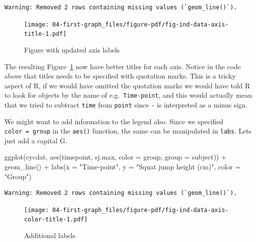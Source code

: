 \documentclass[
  11pt,
  letterpaper,
]{scrbook}
\newenvironment{Shaded}{\begin{snugshade}}{\end{snugshade}}
\newcommand{\AttributeTok}[1]{\textcolor[rgb]{0.40,0.45,0.13}{#1}}
\newcommand{\FunctionTok}[1]{\textcolor[rgb]{0.28,0.35,0.67}{#1}}
\newcommand{\NormalTok}[1]{\textcolor[rgb]{0.00,0.23,0.31}{#1}}
\newcommand{\SpecialCharTok}[1]{\textcolor[rgb]{0.37,0.37,0.37}{#1}}
\newcommand{\StringTok}[1]{\textcolor[rgb]{0.13,0.47,0.30}{#1}}
\begin{document}
\begin{verbatim}
Warning: Removed 2 rows containing missing values (`geom_line()`).
\end{verbatim}

\begin{figure}[H]

{\centering \texttt{[image: 04-first-graph\_files/figure-pdf/fig-ind-data-axis-title-1.pdf]}

}

\caption{\label{fig-ind-data-axis-title}Figure with updated axis labels}

\end{figure}

The resulting Figure~\ref{fig-ind-data-axis-title} now have better
titles for each axis. Notice in the code above that titles needs to be
specified with quotation marks. This is a tricky aspect of R, if we
would have omitted the quotation marks we would have told R to look for
objects by the name of e.g.~\texttt{Time-point}, and this would actually
mean that we tried to subtract \texttt{time} from \texttt{point} since
\texttt{-} is interpreted as a minus sign.

We might want to add information to the legend also. Since we specified
\texttt{color\ =\ group} in the \texttt{aes()} function, the same can be
manipulated in \texttt{labs}. Lets just add a capital G.

\begin{Shaded}
\begin{Highlighting}[numbers=left,,]
\FunctionTok{ggplot}\NormalTok{(cycdat, }\FunctionTok{aes}\NormalTok{(timepoint, sj.max, }\AttributeTok{color =}\NormalTok{ group, }\AttributeTok{group =}\NormalTok{ subject)) }\SpecialCharTok{+} 
  \FunctionTok{geom\_line}\NormalTok{() }\SpecialCharTok{+}
  \FunctionTok{labs}\NormalTok{(}\AttributeTok{x =} \StringTok{"Time{-}point"}\NormalTok{,}
       \AttributeTok{y =} \StringTok{"Squat jump height (cm)"}\NormalTok{, }
       \AttributeTok{color =} \StringTok{"Group"}\NormalTok{)}
\end{Highlighting}
\end{Shaded}

\begin{verbatim}
Warning: Removed 2 rows containing missing values (`geom_line()`).
\end{verbatim}

\begin{figure}[H]

{\centering \texttt{[image: 04-first-graph\_files/figure-pdf/fig-ind-data-axis-color-title-1.pdf]}

}

\caption{\label{fig-ind-data-axis-color-title}Additional labels}

\end{figure}
\end{document}
